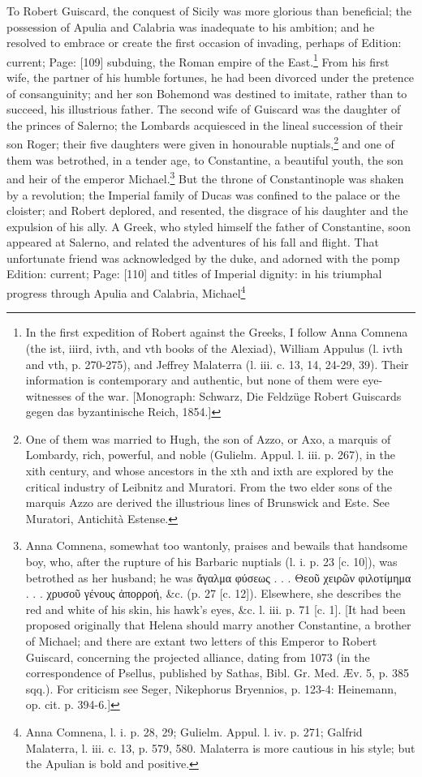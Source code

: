 To Robert Guiscard, the conquest of Sicily was more glorious than beneficial; the possession of Apulia and Calabria was inadequate to his ambition; and he resolved to embrace or create the first occasion of invading, perhaps of Edition: current; Page: [109] subduing, the Roman empire of the East.\footnote{In the first expedition of Robert against the Greeks, I follow Anna Comnena (the ist, iiird, ivth, and vth books of the Alexiad), William Appulus (l. ivth and vth, p. 270-275), and Jeffrey Malaterra (l. iii. c. 13, 14, 24-29, 39). Their information is contemporary and authentic, but none of them were eye-witnesses of the war. [Monograph: Schwarz, Die Feldzüge Robert Guiscards gegen das byzantinische Reich, 1854.]} From his first wife, the partner of his humble fortunes, he had been divorced under the pretence of consanguinity; and her son Bohemond was destined to imitate, rather than to succeed, his illustrious father. The second wife of Guiscard was the daughter of the princes of Salerno; the Lombards acquiesced in the lineal succession of their son Roger; their five daughters were given in honourable nuptials,\footnote{One of them was married to Hugh, the son of Azzo, or Axo, a marquis of Lombardy, rich, powerful, and noble (Gulielm. Appul. l. iii. p. 267), in the xith century, and whose ancestors in the xth and ixth are explored by the critical industry of Leibnitz and Muratori. From the two elder sons of the marquis Azzo are derived the illustrious lines of Brunswick and Este. See Muratori, Antichità Estense.} and one of them was betrothed, in a tender age, to Constantine, a beautiful youth, the son and heir of the emperor Michael.\footnote{Anna Comnena, somewhat too wantonly, praises and bewails that handsome boy, who, after the rupture of his Barbaric nuptials (l. i. p. 23 [c. 10]), was betrothed as her husband; he was \textgreek{\texthebrew{ἄ}γαλμα φύσεως . . . Θεο\texthebrew{ῦ} χειρ\texthebrew{ῶ}ν φιλοτίμημα . . . χρυσο\texthebrew{ῦ} γένους \texthebrew{ἀ}πορροή}, \&c. (p. 27 [c. 12]). Elsewhere, she describes the red and white of his skin, his hawk\texthebrew{}’s eyes, \&c. l. iii. p. 71 [c. 1]. [It had been proposed originally that Helena should marry another Constantine, a brother of Michael; and there are extant two letters of this Emperor to Robert Guiscard, concerning the projected alliance, dating from 1073 (in the correspondence of Psellus, published by Sathas, Bibl. Gr. Med. Æv. 5, p. 385 sqq.). For criticism see Seger, Nikephorus Bryennios, p. 123-4: Heinemann, op. cit. p. 394-6.]} But the throne of Constantinople was shaken by a revolution; the Imperial family of Ducas was confined to the palace or the cloister; and Robert deplored, and resented, the disgrace of his daughter and the expulsion of his ally. A Greek, who styled himself the father of Constantine, soon appeared at Salerno, and related the adventures of his fall and flight. That unfortunate friend was acknowledged by the duke, and adorned with the pomp Edition: current; Page: [110] and titles of Imperial dignity: in his triumphal progress through Apulia and Calabria, Michael\footnote{Anna Comnena, l. i. p. 28, 29; Gulielm. Appul. l. iv. p. 271; Galfrid Malaterra, l. iii. c. 13, p. 579, 580. Malaterra is more cautious in his style; but the Apulian is bold and positive.

}
